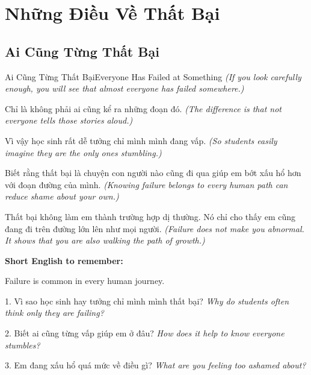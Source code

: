 \chapter{Những Điều Về Thất Bại}

\section{Ai Cũng Từng Thất Bại}
\begin{truyen}{Ai Cũng Từng Thất Bại}{Everyone Has Failed at Something}
\textit{(If you look carefully enough, you will see that almost everyone has failed somewhere.)}

Chỉ là không phải ai cũng kể ra những đoạn đó.
\textit{(The difference is that not everyone tells those stories aloud.)}

Vì vậy học sinh rất dễ tưởng chỉ mình mình đang vấp.
\textit{(So students easily imagine they are the only ones stumbling.)}

Biết rằng thất bại là chuyện con người nào cũng đi qua giúp em bớt xấu hổ hơn với đoạn đường của mình.
\textit{(Knowing failure belongs to every human path can reduce shame about your own.)}
\end{truyen}

\begin{baihoc}
Thất bại không làm em thành trường hợp dị thường. Nó chỉ cho thấy em cũng đang đi trên đường lớn lên như mọi người.
\textit{(Failure does not make you abnormal. It shows that you are also walking the path of growth.)}
\end{baihoc}

\begin{ghinhoanh}
\textbf{Short English to remember:}

Failure is common in every human journey.

\end{ghinhoanh}

\begin{tuhocnhanh}
1. Vì sao học sinh hay tưởng chỉ mình mình thất bại? \textit{Why do students often think only they are failing?}

2. Biết ai cũng từng vấp giúp em ở đâu? \textit{How does it help to know everyone stumbles?}

3. Em đang xấu hổ quá mức về điều gì? \textit{What are you feeling too ashamed about?}
\end{tuhocnhanh}
\ngancach

